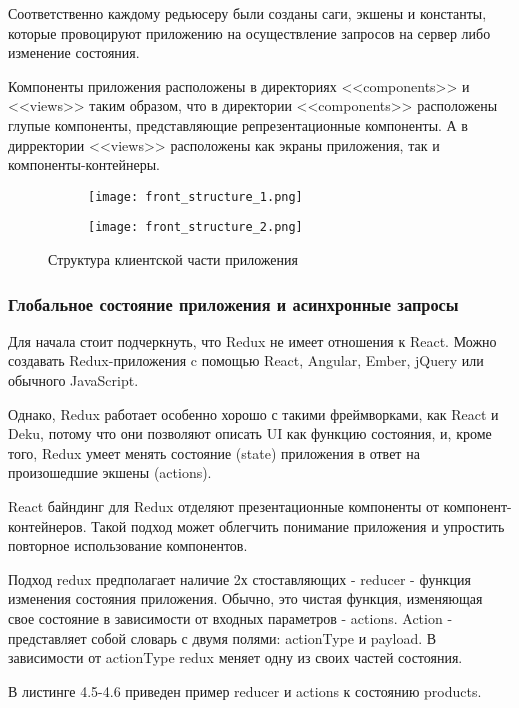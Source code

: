 Соответственно каждому редьюсеру были созданы саги, экшены и константы, которые провоцируют приложению на осуществление запросов на сервер либо изменение состояния.

Компоненты приложения расположены в директориях <<components>> и <<views>> таким образом, что в директории <<components>> расположены глупые компоненты, представляющие репрезентационные компоненты.
А в дирректории <<views>> расположены как экраны приложения, так и компоненты-контейнеры.
\begin{figure}[h]
    \begin{subfigure}[b]{0.45\textwidth}
    \centering
    \texttt{[image: front\_structure\_1.png]}
    \caption{}
    \end{subfigure}
    \begin{subfigure}[b]{0.3\textwidth}
    \centering
    \texttt{[image: front\_structure\_2.png]}
    \caption{}
    \end{subfigure}
    \caption{ Структура клиентской части приложения }
    \label{front:struct}
\end{figure}

\subsubsection{Глобальное состояние приложения и асинхронные запросы}\hfill
Для начала стоит подчеркнуть, что Redux не имеет отношения к React.
Можно создавать Redux-приложения c помощью React, Angular, Ember, jQuery или обычного JavaScript.

Однако, Redux работает особенно хорошо с такими фреймворками, как React и Deku, потому что они позволяют описать UI как функцию состояния, и, кроме того, Redux умеет менять состояние (state) приложения в ответ на произошедшие экшены (actions).

React байндинг для Redux отделяют презентационные компоненты от компонент-контейнеров.
Такой подход может облегчить понимание приложения и упростить повторное использование компонентов.

Подход redux предполагает наличие 2х стоставляющих - reducer - функция изменения состояния приложения.
Обычно, это чистая функция, изменяющая свое состояние в зависимости от входных параметров - actions.
Action - представляет собой словарь с двумя полями: actionType  и payload.
В зависимости от actionType redux меняет одну из своих частей состояния.

В листинге 4.5-4.6 приведен пример reducer и actions к состоянию products.

